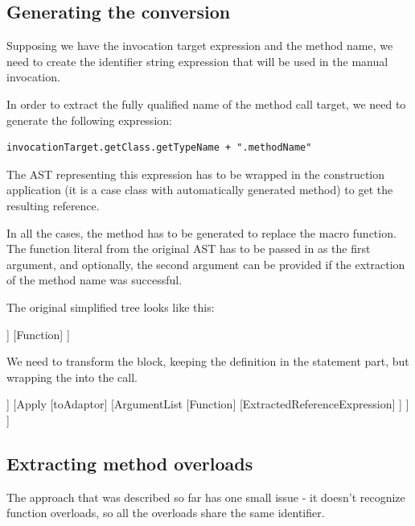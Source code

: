 \subsection{Generating the conversion}
\label{subsec:generate_conversion}

Supposing we have the invocation target expression and the method name, we need to create the identifier string expression that will be used in the manual  invocation.

In order to extract the fully qualified name of the method call target, we need to generate the following expression:

\lstset{style=Scala}
\begin{lstlisting}
invocationTarget.getClass.getTypeName + ".methodName"
\end{lstlisting}

The AST representing this expression has to be wrapped in the  construction application (it is a case class with automatically generated  method) to get the resulting reference.

In all the cases, the  method has to be generated to replace the macro function. The function literal from the original AST has to be passed in as the first argument, and optionally, the second argument can be provided if the extraction of the method name was successful.

The original simplified tree looks like this:

\begin{forest}
	[Block
	  [Statements
	    [ValDef]
	  ]
	  [Function]
	]
\end{forest}

We need to transform the block, keeping the definition in the statement part, but wrapping the  into the  call.
	
\begin{forest}
	[Block
	[Statements
	[ValDef]
	]
	[Apply
	  [toAdaptor]
	  [ArgumentList
	    [Function]
	    [ExtractedReferenceExpression]
	  ]
	]
	]
\end{forest}

\subsection{Extracting method overloads}

The approach that was described so far has one small issue - it doesn't recognize function overloads, so all the overloads share the same identifier.

